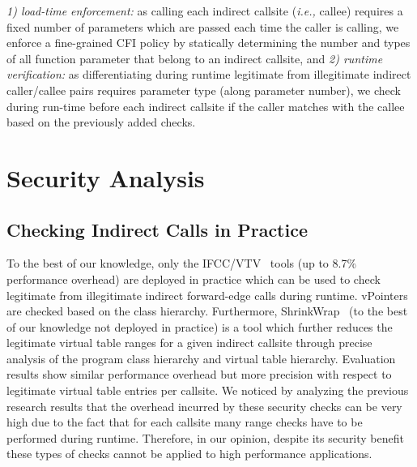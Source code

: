 \textit{1) load-time enforcement:} as calling each indirect callsite (\textit{i.e.,} callee) requires a fixed number of parameters which are passed each time the caller is calling, we enforce a fine-grained CFI policy by statically determining the number and types of all function parameter that belong to an indirect callsite, and
\textit{2) runtime verification:} as differentiating during runtime legitimate from illegitimate indirect caller/callee pairs requires parameter type (along parameter number), we check during run-time before each indirect callsite if the caller matches with the callee based on the previously added checks.

\section{Security Analysis}

\subsection{Checking Indirect Calls in Practice}
\label{C++ Indirect Calls in Practice}
To the best of our knowledge, only the IFCC/VTV~\cite{vtv:tice} tools (up to 8.7\% performance overhead) are deployed in practice
which can be used to check legitimate from illegitimate indirect forward-edge calls during runtime. vPointers are checked based on the class hierarchy. Furthermore, ShrinkWrap~\cite{haller:shrinkwrap} (to the best of our knowledge not deployed in practice) is a tool which further reduces the legitimate virtual table ranges for a given indirect callsite through precise analysis of the program class hierarchy and virtual table hierarchy. Evaluation results show similar performance overhead but more precision with respect to legitimate virtual table entries per callsite. We noticed by analyzing the previous research results that the overhead incurred by these security checks can be very high due to the fact that for each callsite many range checks have to be performed during runtime. Therefore, in our opinion, despite its security benefit these types of checks cannot be applied to high performance applications.

